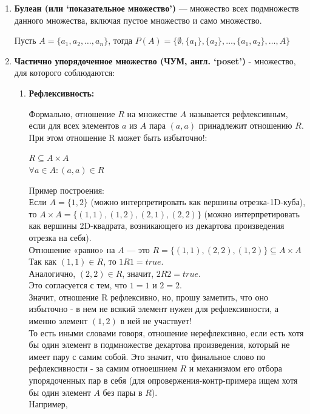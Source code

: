 \documentclass{book}
\begin{document}
\begin{enumerate}[label=\arabic*., parsep=4pt, itemsep=4pt, topsep=4pt, partopsep=0pt]
\item \textbf{Булеан (или `показательное множество')} — множество всех подмножеств данного множества, включая пустое множество и само множество.

Пусть $A = \{a_1, a_2, \ldots , a_n\}$, тогда $P(A) = \{\emptyset, \{a_1\}, \{a_2\}, \ldots , \{a_1, a_2 \}, \ldots , A\}$

\item \textbf{Частично упорядоченное множество (ЧУМ, англ. `poset')} - множество, для которого соблюдаются:

\begin{enumerate}[label=\arabic*., parsep=4pt, itemsep=4pt, topsep=4pt, partopsep=0pt]

\item \textbf{Рефлексивность:}

Формально, отношение $R$ на множестве $A$ называется рефлексивным, если для всех элементов $a$ из $A$ пара $(a, a)$ принадлежит отношению $R$. При этом отношение R может быть избыточно!:

$R \subseteq A \times A$\\
$\forall a \in A: (a,a) \in R$

Пример построения:\\
Если $A=\{1,2\}$ (можно интерпретировать как вершины отрезка-1D-куба), то $A \times A = \{(1,1),(1,2),(2,1),(2,2)\}$ (можно интерпретировать как вершины 2D-квадрата, возникающего из декартова произведения отрезка на себя).\\
Отношение «равно» на $A$ — это $R = \{(1,1), (2,2), (1,2)\} \subseteq A \times A$\\
Так как $(1,1) \in R$, то $1R1 = true$.\\
Аналогично, $(2,2) \in R$, значит, $2R2 = true$.\\
Это согласуется с тем, что $1=1$ и $2=2$.\\
Значит, отношение R рефлексивно, но, прошу заметить, что оно избыточно - в нем не всякий элемент нужен для рефлексивности, а именно элемент $(1,2)$ в ней не участвует!\\
То есть иными словами говоря, отношение нерефлексивно, если есть хотя бы один элемент в подмножестве декартова произведения, который не имеет пару с самим собой. Это значит, что финальное слово по рефлексивности - за самим отноешнием $R$ и механизмом его отбора упорядоченных пар в себя (для опровержения-контр-примера ищем хотя бы один элемент $A$ без пары в $R$). \\

Например,


\end{enumerate}
\end{enumerate}
\end{document}
